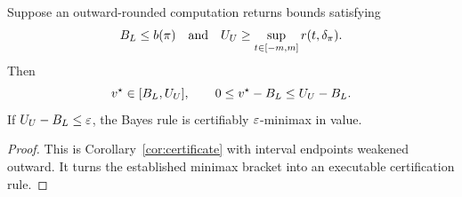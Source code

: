 \begin{theorem}
\label{thm:verifier}
Suppose an outward-rounded computation returns bounds satisfying
\[
 B_L\le b(\pi)
 \quad\text{and}\quad
 U_U\ge\sup_{t\in[-m,m]}r(t,\delta_\pi).
\]
Then
\[
 v^\star\in[B_L,U_U],\qquad
 0\le v^\star-B_L\le U_U-B_L.
\]
If $U_U-B_L\le\varepsilon$, the Bayes rule is certifiably $\varepsilon$-minimax in value.
\end{theorem}

\begin{proof}
This is Corollary~\ref{cor:certificate} with interval endpoints weakened
outward.  It turns the established minimax bracket into an executable
certification rule.
\end{proof}
